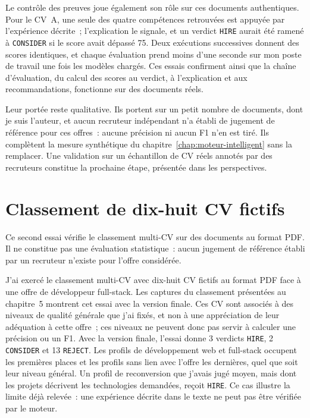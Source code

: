 Le contrôle des preuves joue également son rôle sur ces documents authentiques. Pour le CV~A, une seule des quatre compétences retrouvées est appuyée par l'expérience décrite~; l'explication le signale, et un verdict \texttt{HIRE} aurait été ramené à \texttt{CONSIDER} si le score avait dépassé 75. Deux exécutions successives donnent des scores identiques, et chaque évaluation prend moins d'une seconde sur mon poste de travail une fois les modèles chargés. Ces essais confirment ainsi que la chaîne d'évaluation, du calcul des scores au verdict, à l'explication et aux recommandations, fonctionne sur des documents réels.

Leur portée reste qualitative. Ils portent sur un petit nombre de documents, dont je suis l'auteur, et aucun recruteur indépendant n'a établi de jugement de référence pour ces offres~: aucune précision ni aucun F1 n'en est tiré. Ils complètent la mesure synthétique du chapitre~\ref{chap:moteur-intelligent} sans la remplacer. Une validation sur un échantillon de CV réels annotés par des recruteurs constitue la prochaine étape, présentée dans les perspectives.

\section{Classement de dix-huit CV fictifs}

Ce second essai vérifie le classement multi-CV sur des documents au format PDF. Il ne constitue pas une évaluation statistique~: aucun jugement de référence établi par un recruteur n'existe pour l'offre considérée.

J'ai exercé le classement multi-CV avec dix-huit CV fictifs au format PDF face à une offre de développeur full-stack. Les captures du classement présentées au chapitre~5 montrent cet essai avec la version finale. Ces CV sont associés à des niveaux de qualité générale que j'ai fixés, et non à une appréciation de leur adéquation à cette offre~; ces niveaux ne peuvent donc pas servir à calculer une précision ou un F1. Avec la version finale, l'essai donne 3 verdicts \texttt{HIRE}, 2 \texttt{CONSIDER} et 13 \texttt{REJECT}. Les profils de développement web et full-stack occupent les premières places et les profils sans lien avec l'offre les dernières, quel que soit leur niveau général. Un profil de reconversion que j'avais jugé moyen, mais dont les projets décrivent les technologies demandées, reçoit \texttt{HIRE}. Ce cas illustre la limite déjà relevée~: une expérience décrite dans le texte ne peut pas être vérifiée par le moteur.
